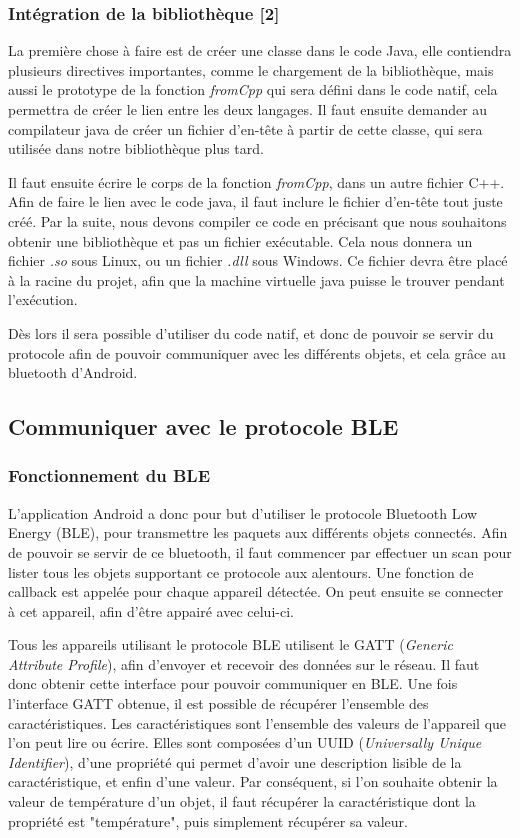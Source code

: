 \subsubsection{Intégration de la bibliothèque [2]}
La première chose à faire est de créer une classe dans le code Java, elle contiendra plusieurs directives 
importantes, comme le chargement de la bibliothèque, mais aussi le prototype de la fonction 
\emph{fromCpp} qui 
sera défini dans le code natif, cela permettra de créer le lien entre les deux langages. Il faut ensuite 
demander au compilateur java de créer un fichier d'en-tête à partir de cette classe, qui sera utilisée dans 
notre bibliothèque plus tard.

Il faut ensuite écrire le corps de la fonction \emph{fromCpp}, dans un autre fichier C++. Afin de faire le 
lien avec le code java, il faut inclure le fichier d'en-tête tout juste créé. Par la suite, nous devons 
compiler ce code en précisant que nous souhaitons obtenir une bibliothèque et pas un fichier 
exécutable. Cela 
nous donnera un fichier \emph{.so} sous Linux, ou un fichier \emph{.dll} sous Windows. Ce fichier devra 
être placé à la racine du projet, afin que la machine virtuelle java puisse le trouver pendant l'exécution.

Dès lors il sera possible d'utiliser du code natif, et donc de pouvoir se servir du protocole afin 
de pouvoir communiquer avec les différents objets, et cela grâce au bluetooth d'Android.


	\subsection{Communiquer avec le protocole BLE}
	  \subsubsection{Fonctionnement du BLE}
L'application Android a donc pour but d'utiliser le protocole Bluetooth Low Energy (BLE), pour 
transmettre les 
paquets aux différents objets connectés. Afin de pouvoir se servir de ce bluetooth, il faut commencer par 
effectuer un scan pour lister tous les objets supportant ce protocole aux alentours. Une fonction 
de callback est appelée pour chaque appareil détectée. On peut ensuite se connecter à cet appareil, 
afin d'être appairé avec celui-ci.

Tous les appareils utilisant le protocole BLE utilisent le GATT (\emph{Generic Attribute Profile}), afin 
d'envoyer et recevoir des données sur le réseau. Il faut donc obtenir cette interface pour pouvoir 
communiquer en BLE. Une fois l'interface GATT obtenue, il est possible de récupérer l'ensemble des 
caractéristiques. Les caractéristiques sont l'ensemble des valeurs de l'appareil que l'on peut lire 
ou écrire. Elles sont composées d'un UUID (\emph{Universally Unique Identifier}), d'une propriété qui permet 
d'avoir une description lisible de la caractéristique, et enfin d'une valeur. Par conséquent, si l'on souhaite 
obtenir la valeur de température d'un objet, il faut récupérer la caractéristique dont la propriété est 
"température", puis simplement récupérer sa valeur.

